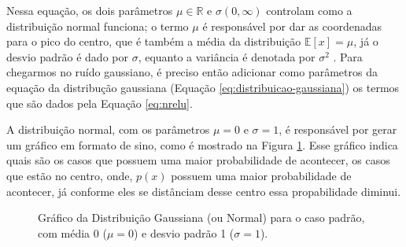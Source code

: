 Nessa equação, os dois parâmetros $\mu \in \mathbb{R}$ e $\sigma (0, \infty)$ controlam como a distribuição normal funciona; o termo $\mu$ é responsável por dar as coordenadas para o pico do centro, que é também a média da distribuição $\mathbb{E}[x] = \mu$, já o desvio padrão é dado por $\sigma$, equanto a variância é denotada por $\sigma^2$ \parencite{DeepLearningBook}. Para chegarmos no ruído gaussiano, é preciso então adicionar como parâmetros da equação da distribução gaussiana (Equação \ref{eq:distribuicao-gaussiana}) os termos que são dados pela Equação \ref{eq:nrelu}. 

A distribuição normal, com os parâmetros $\mu = 0$ e $\sigma=1$, é responsável por gerar um gráfico em formato de sino, como é mostrado na Figura \ref{fig:distribuicao-normal-padrao}. Esse gráfico indica quais são os casos que possuem uma maior probabilidade de acontecer, os casos que estão no centro, onde, $p(x)$ possuem uma maior probabilidade de acontecer, já conforme eles se distânciam desse centro essa propabilidade diminui.

\begin{figure}[htbp]
    \centering
    \caption{Gráfico da Distribuição Gaussiana (ou Normal) para o caso padrão, com média 0 ($\mu = 0$) e desvio padrão 1 ($\sigma = 1$).}
    \label{fig:distribuicao-normal-padrao}
\end{figure}

